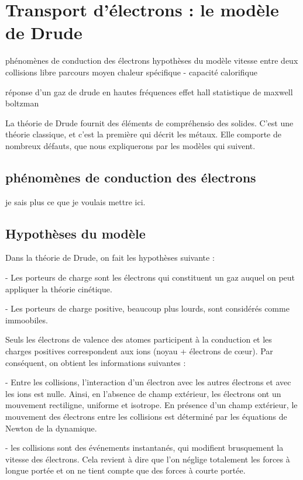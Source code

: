 \chapter{Transport d'électrons : le modèle de Drude}
phénomènes de conduction des électrons
hypothèses du modèle
vitesse entre deux collisions
libre parcours moyen
chaleur spécifique - capacité calorifique

réponse d'un gaz de drude en hautes fréquences
effet hall
statistique de maxwell boltzman

La théorie de Drude fournit des éléments de compréhensio des solides. C'est une
théorie classique, et c'est la première qui décrit les métaux. Elle comporte de
nombreux défauts, que nous expliquerons par les modèles qui suivent.

\section{phénomènes de conduction des électrons}

je sais plus ce que je voulais mettre ici.
\TODO

\section{Hypothèses du modèle}

Dans la théorie de Drude, on fait les hypothèses suivante :

- Les porteurs de charge sont les électrons qui constituent un gaz auquel on peut appliquer la théorie cinétique.

- Les porteurs de charge positive, beaucoup plus lourds, sont considérés comme immoobiles.

Seuls les électrons de valence des atomes participent à la conduction et les charges positives correspondent aux ions (noyau + électrons de cœur). Par conséquent, on obtient les informations suivantes :

- Entre les collisions, l'interaction d'un électron avec les autres électrons et avec les ions est nulle. Ainsi, en l'absence de champ extérieur, les électrons ont un mouvement rectiligne, uniforme et isotrope. En présence d'un champ extérieur, le mouvement des électrons entre les collisions est déterminé par les équations de Newton de la dynamique.

- les collisions sont des événements instantanés, qui modifient brusquement la vitesse des électrons. Cela revient à dire que l'on néglige totalement les forces à longue portée et on ne tient compte que des forces à courte portée.

